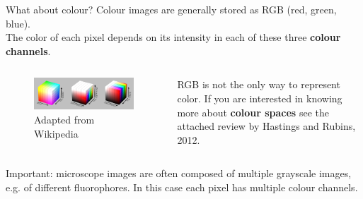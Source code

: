 \documentclass[9pt, aspectratio=169]{beamer}
\begin{document}
\begin{frame}
    {What about colour?}
    Colour images are generally stored as RGB (red, green, blue).\\
    The color of each pixel depends on its intensity in each of these three \textbf{colour channels}.

    \pause

    \begin{columns}
        \begin{column}{0.6\textwidth}
            \begin{figure}
                \includegraphics[width=\textwidth]{colorspaces.png}
                \caption{\color{gray}Adapted from Wikipedia}
            \end{figure}
        \end{column}
        \begin{column}{0.4\textwidth}
            RGB is not the only way to represent color. If you are interested in knowing more about \textbf{colour spaces} see the attached review by Hastings and Rubins, 2012.
        \end{column}
    \end{columns}
    \pause
    Important: microscope images are often composed of multiple grayscale images, e.g. of different fluorophores. In this case each pixel has multiple colour channels.
\end{frame}
\end{document}

